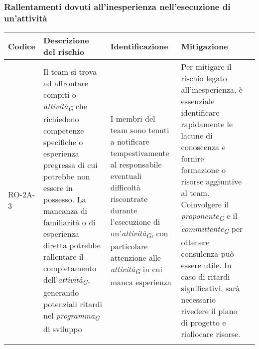 \subsubsection{Rallentamenti dovuti all'inesperienza nell'esecuzione di un'attività} \label{sec:inexpAttività}
\begin{table}[H]
    \centering
    \begin{tabularx}{\textwidth}{l>{\RaggedRight}X>{\RaggedRight}X>{\RaggedRight}X>{\RaggedRight}X}
    \toprule
    \rowcolor{gray!50}
    \textbf{Codice} & \textbf{Descrizione del rischio} & \textbf{Identificazione} & \textbf{Mitigazione} \\
    \midrule
    \addlinespace 
    RO-2A-3 & 
    Il team si trova ad affrontare compiti o \textit{attività}\textsubscript{\textit{G}} che richiedono competenze specifiche o esperienza pregressa di cui potrebbe non essere in possesso. La mancanza di familiarità o di esperienza diretta potrebbe rallentare il completamento dell'\textit{attività}\textsubscript{\textit{G}}, generando potenziali ritardi nel \textit{programma}\textsubscript{\textit{G}} di sviluppo &
    I membri del team sono tenuti a notificare tempestivamente al responsabile eventuali difficoltà riscontrate durante l'esecuzione di un'\textit{attività}\textsubscript{\textit{G}}, con particolare attenzione alle \textit{attività}\textsubscript{\textit{G}} in cui manca esperienza &
    Per mitigare il rischio legato all'inesperienza, è essenziale identificare rapidamente le lacune di conoscenza e fornire formazione o risorse aggiuntive al team. Coinvolgere il \textit{proponente}\textsubscript{\textit{G}} e il \textit{committente}\textsubscript{\textit{G}} per ottenere consulenza può essere utile. In caso di ritardi significativi, sarà necessario rivedere il piano di progetto e riallocare risorse.\\
    \bottomrule
    \addlinespace 
    \end{tabularx}
\end{table}


